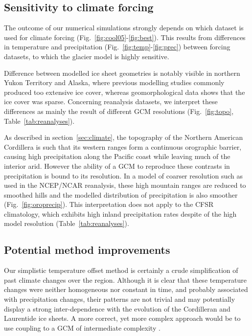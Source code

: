 \subsection{Sensitivity to climate forcing}

The outcome of our numerical simulations strongly depends on which dataset is used for climate forcing (Fig.~\ref{fig:cool05}-\ref{fig:best}). This results from differences in temperature and precipitation (Fig.~\ref{fig:temp}-\ref{fig:prec}) between forcing datasets, to which the glacier model is highly sensitive.

Difference between modelled ice sheet geometries is notably visible in northern Yukon Territory and Alaska, where previous modelling studies commonly produced too extensive ice cover, whereas geomorphological data shows that the ice cover was sparse. Concerning reanalysis datasets, we interpret these differences as mainly the result of different GCM resolutions (Fig.~\ref{fig:topo}, Table~\ref{tab:reanalyses}).

As described in section~\ref{sec:climate}, the topography of the Northern American Cordillera is such that its western ranges form a continuous orographic barrier, causing high precipitation along the Pacific coast while leaving much of the interior arid. However the ability of a GCM to reproduce these contrasts in precipitation is bound to its resolution. In a model of coarser resolution such as used in the NCEP/NCAR reanalysis, these high mountain ranges are reduced to smoothed hills and the modelled distribution of precipitation is also smoother (Fig.~\ref{fig:oroprecip}). This interpretation does not apply to the CFSR climatology, which exhibits high inland precipitation rates despite of the high model resolution (Table~\ref{tab:reanalyses}).

\subsection{Potential method improvements}

Our simplistic temperature offset method is certainly a crude simplification of past climate changes over the region. Although it is clear that these temperature changes were neither homogeneous nor constant in time, and probably associated with precipitation changes, their patterns are not trivial and may potentially display a strong inter-dependence with the evolution of the Cordilleran and Laurentide ice sheets. A more correct, yet more complex approach would be to use coupling to a GCM of intermediate complexity \citep{yoshimori-etal-2001,calov-etal-2002,abeouchi-etal-2007,charbit-etal-2013}.

